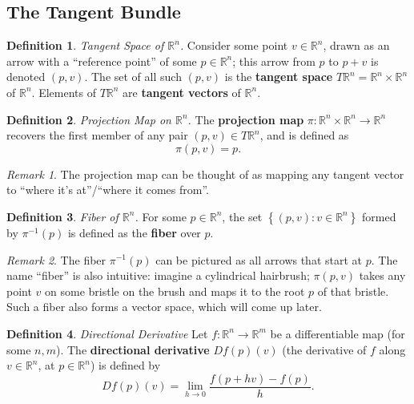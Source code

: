 \documentclass[10pt,landscape]{article}
\theoremstyle{definition}
\newtheorem{definition}{Definition}[section]
\theoremstyle{remark}
\newtheorem*{remark}{Remark}
\newcommand{\R}{\mathbb{R}}
\newcommand{\Rn}{\mathbb{R}^n}
\begin{document}
\begin{multicols*}{3}
\section{The Tangent Bundle}

\theoremstyle{definition}
\begin{definition}{\textit{Tangent Space of $\Rn$.}}
Consider some point $v\in\Rn$, drawn as an arrow with a ``reference point'' of some $p\in\Rn$; this arrow from $p$ to $p+v$ is denoted $(p,v)$. The set of all such $(p,v)$ is the \textbf{tangent space} $T\Rn = \Rn\times\Rn$ of $\Rn$. Elements of $T\Rn$ are \textbf{tangent vectors} of $\Rn$.
\end{definition}

\begin{definition}{\textit{Projection Map on $\Rn$.}}
The \textbf{projection map} $\pi:\Rn\times\Rn\rightarrow\Rn$ recovers the first member of any pair $(p, v)\in T\Rn$, and is defined as
\begin{equation}
    \pi(p, v) = p.
\end{equation}
\end{definition}

\begin{remark}
The projection map can be thought of as mapping any tangent vector to ``where it's at''/``where it comes from''.
\end{remark}

\begin{definition}{\textit{Fiber of $\Rn$.}}
For some $p\in\Rn$, the set $\left\{(p,v) : v\in\Rn\right\}$ formed by $\pi^{-1}(p)$ is defined as the \textbf{fiber} over $p$.
\end{definition}

\begin{remark}
The fiber $\pi^{-1}(p)$ can be pictured as all arrows that start at $p$. The name ``fiber'' is also intuitive: imagine a cylindrical hairbrush; $\pi (p,v)$ takes any point $v$ on some bristle on the brush and maps it to the root $p$ of that bristle. Such a fiber also forms a vector space, which will come up later.
\end{remark}

\begin{definition}{\textit{Directional Derivative}}
Let $f:\Rn\rightarrow\R^m$ be a differentiable map (for some $n, m$). The \textbf{directional derivative} $Df(p)(v)$ (the derivative of $f$ along $v\in\Rn$, at $p\in\Rn$) is defined by
\begin{equation}
    Df(p)(v)= \lim_{h\rightarrow 0} \frac{f(p+hv) - f(p)}{h}.
\end{equation}



\end{definition}
\end{multicols*}
\end{document}
